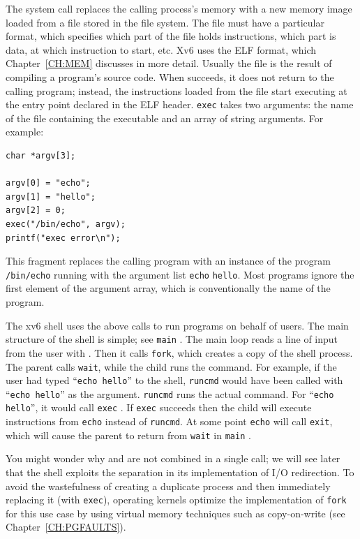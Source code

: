 The
system call
replaces the calling process's memory with a new memory
image loaded from a file stored in the file system.
The file must have a particular format, which specifies which part of
the file holds instructions, which part is data, at which instruction
to start, etc. Xv6
uses the ELF format, which Chapter~\ref{CH:MEM} discusses in
more detail.
Usually the file is the result of compiling a program's source code.
When
succeeds, it does not return to the calling program;
instead, the instructions loaded from the file start
executing at the entry point declared in the ELF header.
\lstinline{exec}
takes two arguments: the name of the file containing the
executable and an array of string arguments.
For example:
\begin{lstlisting}[]
char *argv[3];

argv[0] = "echo";
argv[1] = "hello";
argv[2] = 0;
exec("/bin/echo", argv);
printf("exec error\n");
\end{lstlisting}
This fragment replaces the calling program with an instance
of the program 
\lstinline{/bin/echo}
running with the argument list
\lstinline{echo}
\lstinline{hello}.
Most programs ignore the first element of the argument array, which is 
conventionally the name of the program.

The xv6 shell uses the above calls to run programs on behalf of
users. The main structure of the shell is simple; see
\lstinline{main} 
.
The main loop reads a line of input from the user with
.
Then it calls 
\lstinline{fork}, 
which creates a copy of the shell process. The
parent calls
\lstinline{wait},
while the child runs the command.  For example, if the user
had typed
``\lstinline{echo hello}''
to the shell,
\lstinline{runcmd}
would have been called with
``\lstinline{echo hello}''
as the argument.
\lstinline{runcmd} 
runs the actual command. For
``\lstinline{echo hello}'',
it would call
\lstinline{exec} 
.
If
\lstinline{exec}
succeeds then the child will execute instructions from
\lstinline{echo}
instead of
\lstinline{runcmd}.  
At some point
\lstinline{echo}
will call
\lstinline{exit},
which will cause the parent to return from
\lstinline{wait}
in 
\lstinline{main}
.

You might wonder why
and
are not combined in a single call; we will see later that 
the shell exploits the separation in its implementation of
I/O redirection.
To avoid the wastefulness of
creating a duplicate process and then immediately replacing it (with \lstinline{exec}),
operating kernels optimize the implementation of
\lstinline{fork}
for this use case by using virtual memory techniques such as
copy-on-write (see Chapter~\ref{CH:PGFAULTS}).

